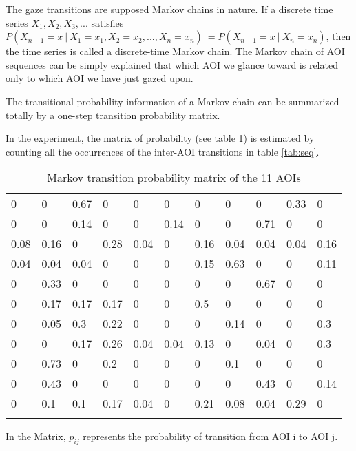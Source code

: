 The gaze transitions are supposed Markov chains in nature. If a discrete time series $X_1,X_2,X_3,...$ satisfies $P(X_{n+1}=x~|~X_1=x_1,X_2=x_2,...,X_n=x_n)~=P(X_{n+1}=x~|~X_n=x_n)$, then the time series is called a discrete-time Markov chain. The Markov chain of AOI sequences can be simply explained that which AOI we glance toward is related only to which AOI we have just gazed upon.

The transitional probability information of a Markov chain can be summarized totally by a one-step transition probability matrix.

In the experiment, the matrix of probability (see table \ref{tab:mat}) is estimated by counting all the occurrences of the inter-AOI transitions in table \ref{tab:seq}.

\begin{table}[H]
\centering
\scriptsize
  \begin{tabular}{@{}lllllllllll@{}}
  0    & 0    & 0.67 & 0    & 0    & 0    & 0    & 0    & 0    & 0.33 & 0    \\
  0    & 0    & 0.14 & 0    & 0    & 0.14 & 0    & 0    & 0.71 & 0    & 0    \\
  0.08 & 0.16 & 0    & 0.28 & 0.04 & 0    & 0.16 & 0.04 & 0.04 & 0.04 & 0.16 \\
  0.04 & 0.04 & 0.04 & 0    & 0    & 0    & 0.15 & 0.63 & 0    & 0    & 0.11 \\
  0    & 0.33 & 0    & 0    & 0    & 0    & 0    & 0    & 0.67 & 0    & 0    \\
  0    & 0.17 & 0.17 & 0.17 & 0    & 0    & 0.5  & 0    & 0    & 0    & 0    \\
  0    & 0.05 & 0.3  & 0.22 & 0    & 0    & 0    & 0.14 & 0    & 0    & 0.3  \\
  0    & 0    & 0.17 & 0.26 & 0.04 & 0.04 & 0.13 & 0    & 0.04 & 0    & 0.3  \\
  0    & 0.73 & 0    & 0.2  & 0    & 0    & 0    & 0.1  & 0    & 0    & 0    \\
  0    & 0.43 & 0    & 0    & 0    & 0    & 0    & 0    & 0.43 & 0    & 0.14 \\
  0    & 0.1  & 0.1  & 0.17 & 0.04 & 0    & 0.21 & 0.08 & 0.04 & 0.29 & 0\\
  \\
  \end{tabular}
\caption{Markov transition probability matrix of the 11 AOIs}
\label{tab:mat}
\end{table}

In the Matrix, $p_{ij}$ represents the probability of transition from AOI i to AOI j.

